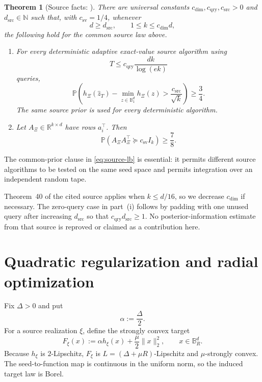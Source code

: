 \documentclass[11pt]{article}
\newcommand{\R}{\mathbb{R}}
\newcommand{\Pp}{\mathbb{P}}
\newcommand{\B}{\mathbb{B}}
\newcommand{\norm}[1]{\lVert #1\rVert_2}
\theoremstyle{plain}
\newtheorem{theorem}{Theorem}[section]
\theoremstyle{definition}
\begin{document}
\begin{theorem}[Source facts: {\cite[Theorems~5 and~40]{ZhangEtAl2026}}]\label{thm:source-facts}
There are universal constants $c_{\mathrm{dim}},c_{\mathrm{qry}},c_{\mathrm{src}}>0$
and $d_{\mathrm{src}}\in\mathbb N$ such that, with
$c_{\mathrm{sv}}=1/4$, whenever
\[
   d\ge d_{\mathrm{src}},
   \qquad
   1\le k\le c_{\mathrm{dim}}d,
\]
the following hold for the common source law above.

\begin{enumerate}[label=(\roman*),leftmargin=2.2em]
\item For every deterministic adaptive exact-value source algorithm using
\[
   T\le c_{\mathrm{qry}}\frac{dk}{\log(ek)}
\]
queries,
\begin{equation}\label{eq:source-lb}
  \Pp\left(
      h_\Xi(\widehat z_T)-\min_{z\in\B_1^d}h_\Xi(z)
      >\frac{c_{\mathrm{src}}}{\sqrt k}
      \right)\ge\frac34.
\end{equation}
The same source prior is used for every deterministic algorithm.

\item Let $A_\Xi\in\R^{k\times d}$ have rows $a_i^\top$.  Then
\begin{equation}\label{eq:spectral-event}
  \Pp\left(A_\Xi A_\Xi^\top\succeq c_{\mathrm{sv}}I_k\right)\ge\frac78.
\end{equation}
\end{enumerate}
\end{theorem}

The common-prior clause in \eqref{eq:source-lb} is essential: it permits different source algorithms to be tested on the same seed space and permits integration over an independent random tape.


Theorem~40 of the cited source applies when $k\le d/16$, so we
decrease $c_{\mathrm{dim}}$ if necessary. The zero-query case in
part~(i) follows by padding with one unused query after increasing
$d_{\mathrm{src}}$ so that $c_{\mathrm{qry}}d_{\mathrm{src}}\ge1$.
No posterior-information estimate from that source is reproved or
claimed as a contribution here.

\section{Quadratic regularization and radial optimization}\label{sec:radial}

Fix $\Delta>0$ and put
\[
   \alpha:=\frac{\Delta}{2}.
\]
For a source realization $\xi$, define the strongly convex target
\begin{equation}\label{eq:hard-family}
   F_\xi(x):=\alpha h_\xi(x)+\frac{\mu}{2}\norm{x}^2,
   \qquad x\in\B_R^d.
\end{equation}
Because $h_\xi$ is $2$-Lipschitz, $F_\xi$ is $L=(\Delta+\mu R)$-Lipschitz and $\mu$-strongly convex.  The seed-to-function map is continuous in the uniform norm, so the induced target law is Borel.
\end{document}
